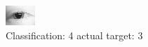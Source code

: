 \begin{figure}[h!]
\begin{center}
\includegraphics[width=0.60\columnwidth]{figures/ID69_class_4_target_3.png}
\end{center}
\caption{ Classification: 4 actual target: 3}
\label{fig:ID69_class_4_target_3}
\end{figure}

